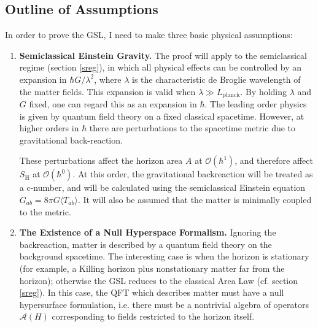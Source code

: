 \documentclass{article}
\begin{document}
\subsection{Outline of Assumptions}\label{outline}

In order to prove the GSL, I need to make three basic physical assumptions:
\begin{enumerate}
\item \textbf{Semiclassical Einstein Gravity.}
The proof will apply to the semiclassical regime (section \ref{sreg}), in which all physical effects can be controlled by an expansion in $\hbar G / \lambda^2$, where $\lambda$ is the characteristic de Broglie wavelength of the matter fields.  This expansion is valid when $\lambda \gg L_\mathrm{planck}$.  By holding $\lambda$ and $G$ fixed, one can regard this as an expansion in $\hbar$.  The leading order physics is given by quantum field theory on a fixed classical spacetime.  However, at higher orders in $\hbar$ there are perturbations to the spacetime metric due to gravitational back-reaction.

These perturbations affect the horizon area $A$ at $\mathcal{O}(\hbar^1)$, and therefore affect $S_\mathrm{H}$ at $\mathcal{O}(\hbar^0)$.  At this order, the gravitational backreaction will be treated as a c-number, and will be calculated using the semiclassical Einstein equation $G_{ab} = 8\pi G \langle T_{ab} \rangle$.  It will also be assumed that the matter is minimally coupled to the metric.

\item \textbf{The Existence of a Null Hyperspace Formalism.}
Ignoring the backreaction, matter is described by a quantum field theory on the background spacetime.  The interesting case is when the horizon is stationary (for example, a Killing horizon plus nonstationary matter far from the horizon); otherwise the GSL reduces to the classical Area Law (cf. section \ref{sreg}).  In this case, the QFT which describes matter must have a null hypersurface formulation, i.e. there must be a nontrivial algebra of operators $\mathcal{A}(H)$ corresponding to fields restricted to the horizon itself.


\end{enumerate}
\end{document}

